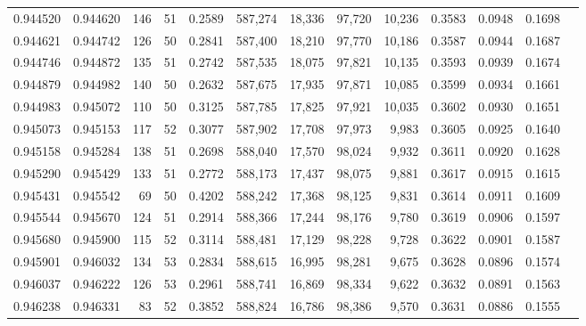 \begin{tabular}{rrrrrrrrrrrrr}
0.944520 & 0.944620 &   146 &  51 &                                     0.2589 & 587,274 &  18,336 &  97,720 &  10,236 & 0.3583 & 0.0948 & 0.1698 \\
0.944621 & 0.944742 &   126 &  50 &                                     0.2841 & 587,400 &  18,210 &  97,770 &  10,186 & 0.3587 & 0.0944 & 0.1687 \\
0.944746 & 0.944872 &   135 &  51 &                                     0.2742 & 587,535 &  18,075 &  97,821 &  10,135 & 0.3593 & 0.0939 & 0.1674 \\
0.944879 & 0.944982 &   140 &  50 &                                     0.2632 & 587,675 &  17,935 &  97,871 &  10,085 & 0.3599 & 0.0934 & 0.1661 \\
0.944983 & 0.945072 &   110 &  50 &                                     0.3125 & 587,785 &  17,825 &  97,921 &  10,035 & 0.3602 & 0.0930 & 0.1651 \\
0.945073 & 0.945153 &   117 &  52 &                                     0.3077 & 587,902 &  17,708 &  97,973 &   9,983 & 0.3605 & 0.0925 & 0.1640 \\
0.945158 & 0.945284 &   138 &  51 &                                     0.2698 & 588,040 &  17,570 &  98,024 &   9,932 & 0.3611 & 0.0920 & 0.1628 \\
0.945290 & 0.945429 &   133 &  51 &                                     0.2772 & 588,173 &  17,437 &  98,075 &   9,881 & 0.3617 & 0.0915 & 0.1615 \\
0.945431 & 0.945542 &    69 &  50 &                                     0.4202 & 588,242 &  17,368 &  98,125 &   9,831 & 0.3614 & 0.0911 & 0.1609 \\
0.945544 & 0.945670 &   124 &  51 &                                     0.2914 & 588,366 &  17,244 &  98,176 &   9,780 & 0.3619 & 0.0906 & 0.1597 \\
0.945680 & 0.945900 &   115 &  52 &                                     0.3114 & 588,481 &  17,129 &  98,228 &   9,728 & 0.3622 & 0.0901 & 0.1587 \\
0.945901 & 0.946032 &   134 &  53 &                                     0.2834 & 588,615 &  16,995 &  98,281 &   9,675 & 0.3628 & 0.0896 & 0.1574 \\
0.946037 & 0.946222 &   126 &  53 &                                     0.2961 & 588,741 &  16,869 &  98,334 &   9,622 & 0.3632 & 0.0891 & 0.1563 \\
0.946238 & 0.946331 &    83 &  52 &                                     0.3852 & 588,824 &  16,786 &  98,386 &   9,570 & 0.3631 & 0.0886 & 0.1555 \\

\end{tabular}
